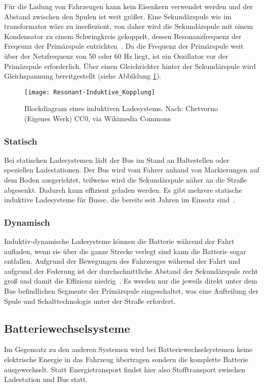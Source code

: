 Für die Ladung von Fahrzeugen kann kein Eisenkern verwendet werden und der Abstand zwischen den Spulen ist weit größer. Eine Sekundärspule wie im transformator wäre zu ineefiezient, von daher wird die Sekundärspule mit einem Kondensator zu einem Schwingkreis gekoppelt, dessen Resonanzfrequenz der Freqeunz der Primärspule entrichten~\cite{Kurs06072007}. Da die Frequenz der Primärspule weit über der Netzfrequenz von 50 oder 60 Hz liegt, ist ein Oszillator vor der Primärspule erforderlich. Über einen Gleichrichter hinter der Sekundärspule wird Gleichspannung bereitgestellt (siehe Abbildung \ref{abb_ResIndKopplung}).

\begin{figure}\centering
	\texttt{[image: Resonant-Induktive\_Kopplung]}
	\caption{Blockdiagram eines induktiven Ladesystems. Nach: Chetvorno (Eigenes Werk) CC0, via Wikimedia Commons}
	\label{abb_ResIndKopplung}
\end{figure}

\subsubsection{Statisch}
Bei statischen Ladesystemen lädt der Bus im Stand an Haltestellen oder speziellen Ladestationen. Der Bus wird vom Fahrer anhand von Markierungen auf dem Boden ausgerichtet, teilweise wird die Sekundärspule näher an die Straße abgesenkt. Dadurch kann effizient geladen werden. Es gibt mehrere statische induktive Ladesysteme für Busse, die bereits seit Jahren im Einsatz sind~\cite{WeIPT}.

\subsubsection{Dynamisch}
Induktiv-dynamische Ladesysteme können die Batterie während der Fahrt aufladen, wenn sie über die ganze Strecke verlegt sind kann die Batterie sogar entfallen. Aufgrund der Bewegungen des Fahrzeuges während der Fahrt und aufgrund der Federung ist der durchschnittliche Abstand der Sekundärspule recht groß und damit die Effizienz niedrig~\cite{5618092}. Es werden nur die jeweils direkt unter dem Bus befindlichen Segmente der Primärspule eingeschaltet, was eine Aufteilung der Spule und Schalttechnologie unter der Straße erfordert.

\subsection{Batteriewechselsysteme}
Im Gegensatz zu den anderen Systemen wird bei Batteriewechselsystemen keine elektrische Energie in das Fahrzeug übertragen sondern die komplette Batterie ausgewechselt. Statt Energietransport findet hier also Stofftransport zwischen Ladestation und Bus statt. 

